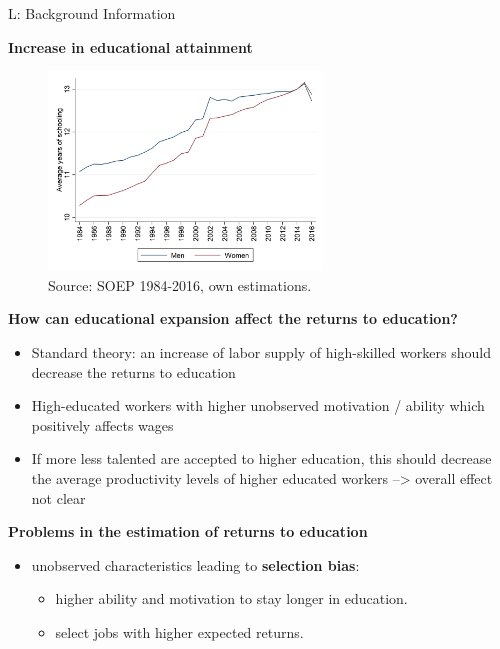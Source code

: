 \documentclass[10pt,ignorenonframetext,]{beamer}
\providecommand{\tightlist}{%
  \setlength{\itemsep}{0pt}\setlength{\parskip}{0pt}}
\begin{document}
\begin{frame}[allowframebreaks]{L: Background Information}
\protect\hypertarget{l-background-information}{}

\textbf{Increase in educational attainment}

\begin{figure}
\centering
\includegraphics[width=\textwidth,height=2.08333in]{img/edu_sex.png}
\caption{Source: SOEP 1984-2016, own estimations.}
\end{figure}

\textbf{How can educational expansion affect the returns to education?}

\begin{itemize}
\tightlist
\item
  Standard theory: an increase of labor supply of high-skilled workers
  should decrease the returns to education
\item
  High-educated workers with higher unobserved motivation / ability
  which positively affects wages
\item
  If more less talented are accepted to higher education, this should
  decrease the average productivity levels of higher educated workers
  --\textgreater{} overall effect not clear
\end{itemize}

\textbf{Problems in the estimation of returns to education}

\begin{itemize}
\tightlist
\item
  unobserved characteristics leading to \textbf{selection bias}:

  \begin{itemize}
  \tightlist
  \item
    higher ability and motivation to stay longer in education.
  \item
    select jobs with higher expected returns.
  \end{itemize}
\end{itemize}

\end{frame}
\end{document}
